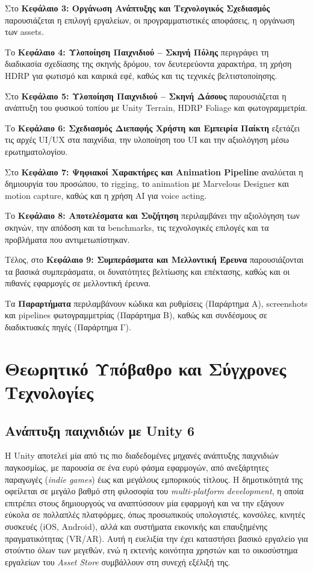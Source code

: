 Στο \textbf{Κεφάλαιο 3: Οργάνωση Ανάπτυξης και Τεχνολογικός Σχεδιασμός}
παρουσιάζεται η επιλογή εργαλείων, οι προγραμματιστικές αποφάσεις, η
οργάνωση των assets.

Το \textbf{Κεφάλαιο 4: Υλοποίηση Παιχνιδιού – Σκηνή Πόλης} περιγράφει τη
διαδικασία σχεδίασης της σκηνής δρόμου, τον δευτερεύοντα χαρακτήρα, τη
χρήση HDRP για φωτισμό και καιρικά εφέ, καθώς και τις τεχνικές
βελτιστοποίησης.

Στο \textbf{Κεφάλαιο 5: Υλοποίηση Παιχνιδιού – Σκηνή Δάσους}
παρουσιάζεται η ανάπτυξη του φυσικού τοπίου με Unity Terrain, HDRP
Foliage και φωτογραμμετρία.

Το \textbf{Κεφάλαιο 6: Σχεδιασμός Διεπαφής Χρήστη και Εμπειρία Παίκτη}
εξετάζει τις αρχές UI/UX στα παιχνίδια, την υλοποίηση του UI και την
αξιολόγηση μέσω ερωτηματολογίου.

Στο \textbf{Κεφάλαιο 7: Ψηφιακοί Χαρακτήρες και Animation Pipeline}
αναλύεται η δημιουργία του προσώπου, το rigging, το animation με
Marvelous Designer και motion capture, καθώς και η χρήση AI για voice
acting.

Το \textbf{Κεφάλαιο 8: Αποτελέσματα και Συζήτηση} περιλαμβάνει την
αξιολόγηση των σκηνών, την απόδοση και τα benchmarks, τις τεχνολογικές
επιλογές και τα προβλήματα που αντιμετωπίστηκαν.

Τέλος, στο \textbf{Κεφάλαιο 9: Συμπεράσματα και Μελλοντική Έρευνα}
παρουσιάζονται τα βασικά συμπεράσματα, οι δυνατότητες βελτίωσης και
επέκτασης, καθώς και οι πιθανές εφαρμογές σε μελλοντική έρευνα.

Τα \textbf{Παραρτήματα} περιλαμβάνουν κώδικα και ρυθμίσεις (Παράρτημα Α),
screenshots και pipelines φωτογραμμετρίας (Παράρτημα Β), καθώς και
συνδέσμους σε διαδικτυακές πηγές (Παράρτημα Γ).

\chapter{Θεωρητικό Υπόβαθρο και Σύγχρονες Τεχνολογίες}
\section{Ανάπτυξη παιχνιδιών με Unity 6}
Η Unity αποτελεί μία από τις πιο διαδεδομένες μηχανές ανάπτυξης παιχνιδιών παγκοσμίως, με παρουσία σε ένα ευρύ φάσμα εφαρμογών, από ανεξάρτητες παραγωγές (\textit{indie games}) έως και μεγάλους εμπορικούς τίτλους. Η δημοτικότητά της οφείλεται σε μεγάλο βαθμό στη φιλοσοφία του \textit{multi-platform development}, η οποία επιτρέπει στους δημιουργούς να αναπτύσσουν μία εφαρμογή και να την εξάγουν εύκολα σε πολλαπλές πλατφόρμες, όπως προσωπικούς υπολογιστές, κονσόλες, κινητές συσκευές (iOS, Android), αλλά και συστήματα εικονικής και επαυξημένης πραγματικότητας (VR/AR). Αυτή η ευελιξία την έχει καταστήσει βασικό εργαλείο για στούντιο όλων των μεγεθών, ενώ η εκτενής κοινότητα χρηστών και το οικοσύστημα εργαλείων του \textit{Asset Store} συμβάλλουν στη συνεχή εξέλιξή της.


